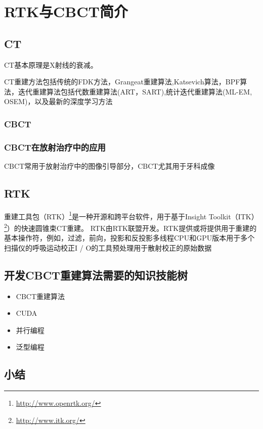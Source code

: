 

\chapter{RTK与CBCT简介}

\section{CT}

CT基本原理\cite{buzug2011computed}是X射线的衰减。


CT重建方法包括传统的FDK方法，Grangeat重建算法,Katsevich算法，BPF算法，迭代重建算法包括代数重建算法(ART，SART),统计迭代重建算法(ML-EM, OSEM)，以及最新的深度学习方法

\subsection{CBCT}


\subsection{CBCT在放射治疗中的应用}
CBCT常用于放射治疗中的图像引导部分，CBCT尤其用于牙科成像



\section{RTK}
重建工具包（RTK\cite{rit2014reconstruction}）\footnote{\textcolor{blue}{\url{http://www.openrtk.org/}}}是一种开源和跨平台软件，用于基于Insight Toolkit（ITK）\footnote{\textcolor{blue}{\url{http://www.itk.org/}}}）的快速圆锥束CT重建。
RTK由RTK联盟开发。RTK提供或将提供用于重建的基本操作符，例如，过滤，前向，投影和反投影多线程CPU和GPU版本用于多个扫描仪的呼吸运动校正I / O的工具预处理用于散射校正的原始数据


\section{开发CBCT重建算法需要的知识技能树}
\begin{itemize}
    \item CBCT重建算法
    \item CUDA
    \item 并行编程
    \item 泛型编程
\end{itemize}

\section{小结}






